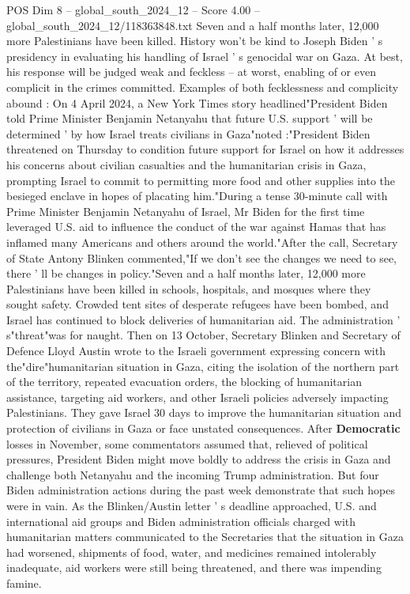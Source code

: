 \begin{textsample}{POS Dim 8 – global\_south\_2024\_12 – Score 4.00 – global\_south\_2024\_12/118363848.txt}  \label{ex:f8_pos_358}
Seven and a half months later, 12,000 more Palestinians have been killed.
History won't be kind to Joseph Biden ' s presidency in evaluating his handling of Israel ' s genocidal war on Gaza.
At best, his response will be judged weak and feckless -- at worst, enabling of or even complicit in the crimes committed.
Examples of both fecklessness and complicity abound : On 4 April 2024, a New York Times story headlined"President Biden told Prime Minister Benjamin Netanyahu that future U.S. support ' will be determined ' by how Israel treats civilians in Gaza"noted :"President Biden threatened on Thursday to condition future support for Israel on how it addresses his concerns about civilian casualties and the humanitarian crisis in Gaza, prompting Israel to commit to permitting more food and other supplies into the besieged enclave in hopes of placating him."During a tense 30-minute call with Prime Minister Benjamin Netanyahu of Israel, Mr Biden for the first time leveraged U.S. aid to influence the conduct of the war against Hamas that has inflamed many Americans and others around the world."After the call, Secretary of State Antony Blinken commented,"If we don't see the changes we need to see, there ' ll be changes in policy."Seven and a half months later, 12,000 more Palestinians have been killed in schools, hospitals, and mosques where they sought safety.
Crowded tent sites of desperate refugees have been bombed, and Israel has continued to block deliveries of humanitarian aid.
The administration ' s"threat"was for naught.
Then on 13 October, Secretary Blinken and Secretary of Defence Lloyd Austin wrote to the Israeli government expressing concern with the"dire"humanitarian situation in Gaza, citing the isolation of the northern part of the territory, repeated evacuation orders, the blocking of humanitarian assistance, targeting aid workers, and other Israeli policies adversely impacting Palestinians.
They gave Israel 30 days to improve the humanitarian situation and protection of civilians in Gaza or face unstated consequences.
After \textbf{Democratic} losses in November, some commentators assumed that, relieved of political pressures, President Biden might move boldly to address the crisis in Gaza and challenge both Netanyahu and the incoming Trump administration.
But four Biden administration actions during the past week demonstrate that such hopes were in vain.
As the Blinken/Austin letter ' s deadline approached, U.S. and international aid groups and Biden administration officials charged with humanitarian matters communicated to the Secretaries that the situation in Gaza had worsened, shipments of food, water, and medicines remained intolerably inadequate, aid workers were still being threatened, and there was impending famine.

\end{textsample}
